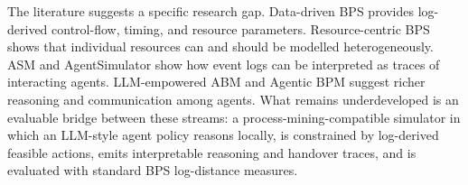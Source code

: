 The literature suggests a specific research gap.
Data-driven BPS provides log-derived control-flow, timing, and resource
parameters. Resource-centric BPS shows that individual resources can and
should be modelled heterogeneously. ASM and AgentSimulator show how event
logs can be interpreted as traces of interacting agents. LLM-empowered
ABM and Agentic BPM suggest richer reasoning and communication among
agents. What remains underdeveloped is an evaluable bridge between these
streams: a process-mining-compatible simulator in which an LLM-style
agent policy reasons locally, is constrained by log-derived feasible
actions, emits interpretable reasoning and handover traces, and is
evaluated with standard BPS log-distance measures.

